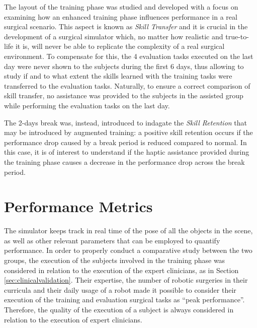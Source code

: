 \documentclass[../main.tex]{subfiles}
\begin{document}
The layout of the training phase was studied and developed with a focus on examining how an enhanced training phase influences performance in a real surgical scenario. This aspect is known as \textit{Skill Transfer} and it is crucial in the development of a surgical simulator which, no matter how realistic and true-to-life it is, will never be able to replicate the complexity of a real surgical environment. To compensate for this, the 4 evaluation tasks executed on the last day were never shown to the subjects during the first 6 days, thus allowing to study if and to what extent the skills learned with the training tasks were transferred to the evaluation tasks. Naturally, to ensure a correct comparison of skill transfer, no assistance was provided to the subjects in the assisted group while performing the evaluation tasks on the last day.

The 2-days break was, instead, introduced to indagate the \textit{Skill Retention} that may be introduced by augmented training: a positive skill retention occurs if the performance drop caused by a break period is reduced compared to normal. In this case, it is of interest to understand if the haptic assistance provided during the training phase causes a decrease in the performance drop across the break period.

\section{Performance Metrics}   
The simulator keeps track in real time of the pose of all the objects in the scene, as well as other relevant parameters that can be employed to quantify performance. In order to properly conduct a comparative study between the two groups, the execution of the subjects involved in the training phase was considered in relation to the execution of the expert clinicians, as in Section \ref{sec:clinicalvalidation}. Their expertise, the number of robotic surgeries in their curricula and their daily usage of a \davinci robot made it possible to consider their execution of the training and evaluation surgical tasks as ``peak performance''. Therefore, the quality of the execution of a subject is always considered in relation to the execution of expert clinicians.
\end{document}

